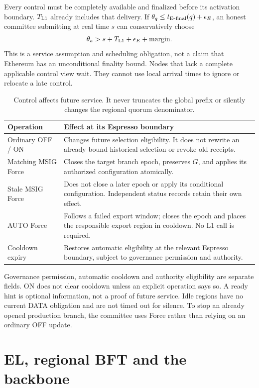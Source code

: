 \documentclass[11pt,a4paper]{article}
\begin{document}
Every control must be completely available and finalized before its
activation boundary. $T_{\rm L1}$ already includes that delivery.
If $\theta_q\le t_{\rm E\mbox{-}final}(q)+\epsilon_E$, an honest
committee submitting at real time $s$ can conservatively choose
\[
 \theta_a>s+T_{\rm L1}+\epsilon_E+\text{margin}.
\]
This is a service assumption and scheduling obligation, not a claim
that Ethereum has an unconditional finality bound. Nodes that lack a
complete applicable control view wait. They cannot use local arrival
times to ignore or relocate a late control.

\begin{table}[H]\centering\small
\begin{tabularx}{\linewidth}{@{}p{.24\linewidth}Y@{}}
\toprule Operation & Effect at its Espresso boundary\\\midrule
Ordinary OFF / ON & Changes future selection eligibility. It does not
rewrite an already bound historical selection or revoke old receipts.\\
Matching MSIG Force & Closes the target branch epoch, preserves $G$,
and applies its authorized configuration atomically.\\
Stale MSIG Force & Does not close a later epoch or apply its conditional
configuration. Independent status records retain their own effect.\\
AUTO Force & Follows a failed export window; closes the epoch and places
the responsible export region in cooldown. No L1 call is required.\\
Cooldown expiry & Restores automatic eligibility at the relevant
Espresso boundary, subject to governance permission and authority.\\\bottomrule
\end{tabularx}
\caption{Control affects future service. It never truncates the global
prefix or silently changes the regional quorum denominator.}
\end{table}

Governance permission, automatic cooldown and authority eligibility are
separate fields. ON does not clear cooldown unless an explicit operation
says so. A ready hint is optional information, not a proof of future
service. Idle regions have no current DATA obligation and are not timed
out for silence. To stop an already opened production branch, the
committee uses Force rather than relying on an ordinary OFF update.

\section{EL, regional BFT and the backbone}\label{sec:sequencing}
\end{document}
